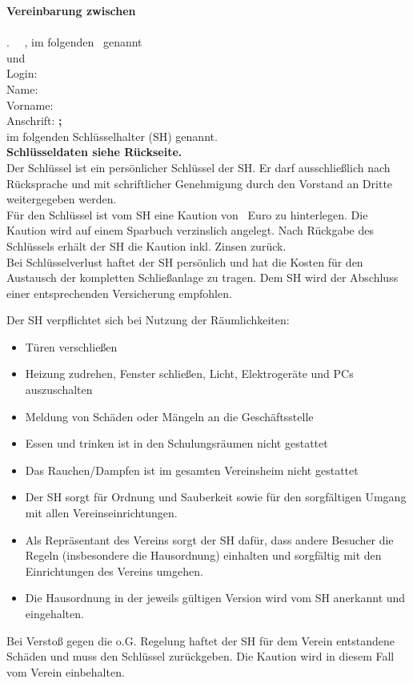 \begin{Form}
	\textbf{Vereinbarung zwischen} \\\\
	\bingoevNameLang. \, \bingoevAddrStrasse \, \bingoevAddrStadt, im folgenden \textit{\bingoevName} \, genannt \\ und \\
	Login: \textbf{\ShLogin} \\
	Name: \textbf{\ShName} \\
	Vorname: \textbf{\ShVorname} \\
	Anschrift: \textbf{\ShAddrStrasse;\,\ShAddrStadt} \\
	im folgenden Schlüsselhalter (SH) genannt.\\
	
	\textbf{Schlüsseldaten siehe Rückseite.}\\
	
	Der Schlüssel ist ein persönlicher Schlüssel der SH. Er darf ausschließlich nach Rücksprache und mit schriftlicher Genehmigung durch den Vorstand an Dritte weitergegeben werden.\\
	
	Für den Schlüssel ist vom SH eine Kaution von \textbf{\ShKaution}\, Euro zu hinterlegen. Die Kaution wird auf einem Sparbuch verzinslich angelegt. Nach Rückgabe des Schlüssels erhält der SH die Kaution inkl. Zinsen zurück.\\
	
	Bei Schlüsselverlust haftet der SH persönlich und hat die Kosten für den Austausch der kompletten Schließanlage zu tragen. Dem SH wird der Abschluss einer entsprechenden Versicherung empfohlen.
	
	Der SH verpflichtet sich bei Nutzung der Räumlichkeiten:
	\begin{itemize}
		\setlength{\itemsep}{-5pt}
		\item Türen verschließen
		\item Heizung zudrehen, Fenster schließen, Licht, Elektrogeräte und PCs auszuschalten
		\item Meldung von Schäden oder Mängeln an die Geschäftsstelle
		\item Essen und trinken ist in den Schulungsräumen nicht gestattet
		\item Das Rauchen/Dampfen ist im gesamten Vereinsheim nicht gestattet
		\item Der SH sorgt für Ordnung und Sauberkeit sowie für den sorgfältigen Umgang mit allen Vereinseinrichtungen.
		\item Als Repräsentant des Vereins sorgt der SH dafür, dass andere Besucher die Regeln (insbesondere die Hausordnung) einhalten und sorgfältig mit den Einrichtungen des Vereins umgehen.
		\item Die Hausordnung in der jeweils gültigen Version wird vom SH anerkannt und eingehalten.
	\end{itemize}
	Bei Verstoß gegen die o.G. Regelung haftet der SH für dem Verein entstandene Schäden und muss den Schlüssel zurückgeben. Die Kaution wird in diesem Fall vom Verein einbehalten.\\
	

\end{Form}
